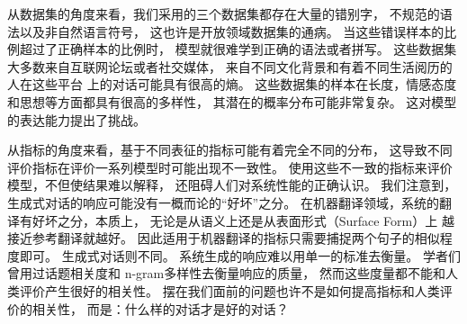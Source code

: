 从数据集的角度来看，我们采用的三个数据集都存在大量的错别字，
不规范的语法以及非自然语言符号，
这也许是开放领域数据集的通病。
当这些错误样本的比例超过了正确样本的比例时，
模型就很难学到正确的语法或者拼写。
这些数据集大多数来自互联网论坛或者社交媒体，
来自不同文化背景和有着不同生活阅历的人在这些平台
上的对话可能具有很高的熵。
这些数据集的样本在长度，情感态度和思想等方面都具有很高的多样性，
其潜在的概率分布可能非常复杂。
这对模型的表达能力提出了挑战。

从指标的角度来看，基于不同表征的指标可能有着完全不同的分布，
这导致不同评价指标在评价一系列模型时可能出现不一致性。
使用这些不一致的指标来评价模型，不但使结果难以解释，
还阻碍人们对系统性能的正确认识。
我们注意到，生成式对话的响应可能没有一概而论的“好坏”之分。
在机器翻译领域，系统的翻译有好坏之分，本质上，
无论是从语义上还是从表面形式（Surface Form）上
越接近参考翻译就越好。
因此适用于机器翻译的指标只需要捕捉两个句子的相似程度即可。
生成式对话则不同。
系统生成的响应难以用单一的标准去衡量。
学者们曾用过话题相关度和
n-gram多样性去衡量响应的质量，
然而这些度量都不能和人类评价产生很好的相关性。
摆在我们面前的问题也许不是如何提高指标和人类评价的相关性，
而是：什么样的对话才是好的对话？
